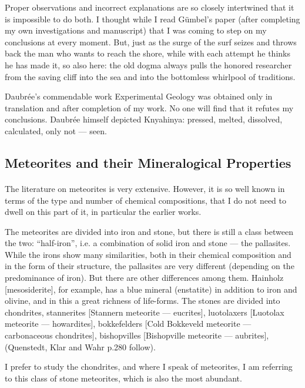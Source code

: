 \documentclass[a4paper, 11pt, oneside]{article}
\begin{document}
Proper observations and incorrect explanations are so closely intertwined that it is impossible to do both. I thought while I read Gümbel's paper (after completing my own investigations and manuscript) that I was coming to step on my conclusions at every moment. But, just as the surge of the surf seizes and throws back the man who wants to reach the shore, while with each attempt he thinks he has made it, so also here: the old dogma always pulls the honored researcher from the saving cliff into the sea and into the bottomless whirlpool of traditions.

Daubrée's commendable work Experimental Geology was obtained only in translation and after completion of my work. No one will find that it refutes my conclusions. Daubrée himself depicted Knyahinya: pressed, melted, dissolved, calculated, only not — seen.
\clearpage
\subsection{Meteorites and their Mineralogical Properties}
\paragraph{}
The literature on meteorites is very extensive. However, it is so well known in terms of the type and number of chemical compositions, that I do not need to dwell on this part of it, in particular the earlier works.

The meteorites are divided into iron and stone, but there is still a class between the two: ``half-iron'', i.e. a combination of solid iron and stone — the pallasites. While the irons show many similarities, both in their chemical composition and in the form of their structure, the pallasites are very different (depending on the predominance of iron). But there are other differences among them. Hainholz [mesosiderite], for example, has a blue mineral (enstatite) in addition to iron and olivine, and in this a great richness of life-forms. The stones are divided into chondrites, stannerites [Stannern meteorite — eucrites], luotolaxers [Luotolax meteorite — howardites], bokkefelders [Cold Bokkeveld meteorite — carbonaceous chondrites], bishopvilles [Bishopville meteorite — aubrites], (Quenstedt, Klar and Wahr p.280 follow).

I prefer to study the chondrites, and where I speak of meteorites, I am referring to this class of stone meteorites, which is also the most abundant.
\end{document}
